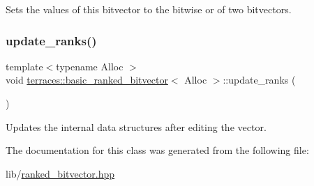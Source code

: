 Sets the values of this bitvector to the bitwise or of two bitvectors. \mbox{\label{classterraces_1_1basic__ranked__bitvector_a329e1115f06aa09cf71ec659ba4a0c13}} 
\subsubsection{\texorpdfstring{update\+\_\+ranks()}{update\_ranks()}}
{\footnotesize\ttfamily template$<$typename Alloc $>$ \\
void \hyperlink{classterraces_1_1basic__ranked__bitvector}{terraces\+::basic\+\_\+ranked\+\_\+bitvector}$<$ Alloc $>$\+::update\+\_\+ranks (\begin{DoxyParamCaption}{ }\end{DoxyParamCaption})}

Updates the internal data structures after editing the vector. 

The documentation for this class was generated from the following file\+:\begin{DoxyCompactItemize}
\item 
lib/\hyperlink{ranked__bitvector_8hpp}{ranked\+\_\+bitvector.\+hpp}\end{DoxyCompactItemize}
